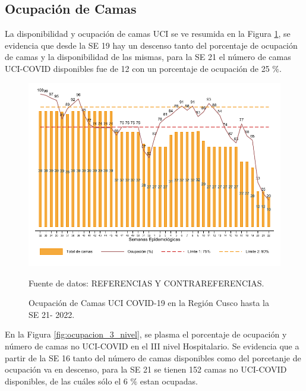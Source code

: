 \documentclass[12pt,a4paper,openany]{book}
\begin{document}
	
	
	\clearpage
	\subsection*{Ocupación de Camas}
	\noindent La disponibilidad y ocupación de camas UCI se ve resumida en la Figura \ref{fig:ocupacion_uci}, se evidencia que desde la SE 19 hay un descenso tanto del porcentaje de ocupación de camas y la disponibilidad de las mismas, para la SE 21 el número de camas UCI-COVID disponibles fue de 12 con un porcentaje de ocupación de 25 $\%$. 
	
	\begin{figure}[h]
		\caption{Ocupación de Camas UCI COVID-19 en la Región Cusco hasta la SE 21- 2022.}\label{fig:ocupacion_uci}
		\begin{center}
			\includegraphics[width=0.95\linewidth]{../figuras/uci.pdf}
		\end{center}
		{\footnotesize {Fuente de datos: REFERENCIAS Y CONTRAREFERENCIAS.}}
	\end{figure}
	\cleardoublepage
	
	En la Figura \ref{fig:ocupacion_3_nivel}, se plasma el porcentaje de ocupación y número de camas no UCI-COVID en el III nivel Hospitalario. Se evidencia que a partir de la SE 16 tanto del número de camas disponibles como del porcetanje de ocupación va en descenso, para la SE 21 se tienen 152 camas no UCI-COVID disponibles, de las cuáles sólo el 6 $\%$ estan ocupadas. 
\end{document}
